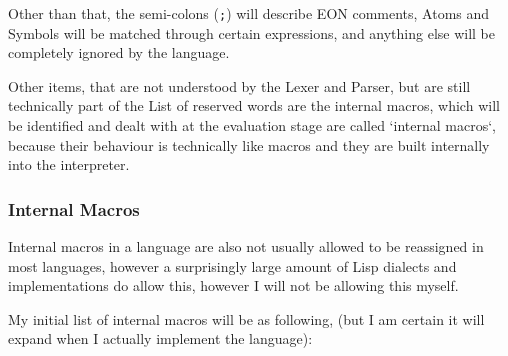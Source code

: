 \documentclass{article}
\newcommand{\code}[1]{\texttt{#1}}
\begin{document}
      Other than that, the semi-colons (\code{;}) will describe EON comments,
      Atoms and Symbols will be matched through certain expressions, and
      anything else will be completely ignored by the language.

      Other items, that are not understood by the Lexer and Parser, but are
      still technically part of the List of reserved words are the internal
      macros, which will be identified and dealt with at the evaluation stage
      are called `internal macros`, because their behaviour is technically like
      macros and they are built internally into the interpreter.

    \subsubsection{Internal Macros}
      Internal macros in a language are also not usually allowed to be reassigned
      in most languages, however a surprisingly large amount of Lisp dialects
      and implementations do allow this, however I will not be allowing this
      myself.


      \clearpage
      My initial list of internal macros will be as following, (but I am certain
      it will expand when I actually implement the language):
\end{document}
